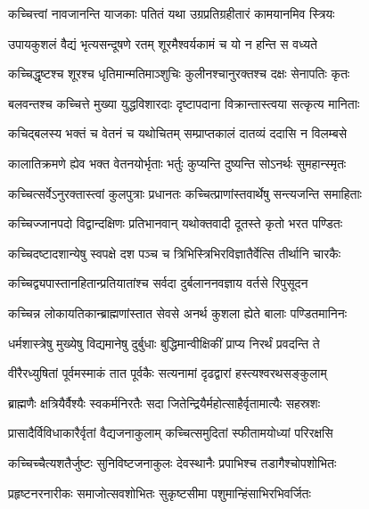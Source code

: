\twolineshloka
{कच्चित्त्वां नावजानन्ति याजकाः पतितं यथा}
{उग्रप्रतिग्रहीतारं कामयानमिव स्त्रियः} %

\twolineshloka
{उपायकुशलं वैद्यं भृत्यसन्दूषणे रतम्}
{शूरमैश्वर्यकामं च यो न हन्ति स वध्यते} %

\twolineshloka
{कच्चिद्धृष्टश्च शूरश्च धृतिमान्मतिमाञ्शुचिः}
{कुलीनश्चानुरक्तश्च दक्षः सेनापतिः कृतः} %

\twolineshloka
{बलवन्तश्च कच्चित्ते मुख्या युद्धविशारदाः}
{दृष्टापदाना विक्रान्तास्त्वया सत्कृत्य मानिताः} %

\twolineshloka
{कचिद्बलस्य भक्तं च वेतनं च यथोचितम्}
{सम्प्राप्तकालं दातव्यं ददासि न विलम्बसे} %

\twolineshloka
{कालातिक्रमणे ह्येव भक्त वेतनयोर्भृताः}
{भर्तुः कुप्यन्ति दुष्यन्ति सोऽनर्थः सुमहान्स्मृतः} %

\twolineshloka
{कच्चित्सर्वेऽनुरक्तास्त्वां कुलपुत्राः प्रधानतः}
{कच्चित्प्राणांस्तवार्थेषु सन्त्यजन्ति समाहिताः} %

\twolineshloka
{कच्चिज्जानपदो विद्वान्दक्षिणः प्रतिभानवान्}
{यथोक्तवादी दूतस्ते कृतो भरत पण्डितः} %

\twolineshloka
{कच्चिदष्टादशान्येषु स्वपक्षे दश पञ्च च}
{त्रिभिस्त्रिभिरविज्ञातैर्वेत्सि तीर्थानि चारकैः} %

\twolineshloka
{कच्चिद्व्यपास्तानहितान्प्रतियातांश्च सर्वदा}
{दुर्बलाननवज्ञाय वर्तसे रिपुसूदन} %

\twolineshloka
{कच्चिन्न लोकायतिकान्ब्राह्मणांस्तात सेवसे}
{अनर्थ कुशला ह्येते बालाः पण्डितमानिनः} %

\twolineshloka
{धर्मशास्त्रेषु मुख्येषु विद्यमानेषु दुर्बुधाः}
{बुद्धिमान्वीक्षिकीं प्राप्य निरर्थं प्रवदन्ति ते} %

\twolineshloka
{वीरैरध्युषितां पूर्वमस्माकं तात पूर्वकैः}
{सत्यनामां दृढद्वारां हस्त्यश्वरथसङ्कुलाम्} %

\twolineshloka
{ब्राह्मणैः क्षत्रियैर्वैश्यैः स्वकर्मनिरतैः सदा}
{जितेन्द्रियैर्महोत्साहैर्वृतामात्यैः सहस्रशः} %

\twolineshloka
{प्रासादैर्विविधाकारैर्वृतां वैद्यजनाकुलाम्}
{कच्चित्समुदितां स्फीतामयोध्यां परिरक्षसि} %

\twolineshloka
{कच्चिच्चैत्यशतैर्जुष्टः सुनिविष्टजनाकुलः}
{देवस्थानैः प्रपाभिश्च तडागैश्चोपशोभितः} %

\twolineshloka
{प्रहृष्टनरनारीकः समाजोत्सवशोभितः}
{सुकृष्टसीमा पशुमान्हिंसाभिरभिवर्जितः} %

